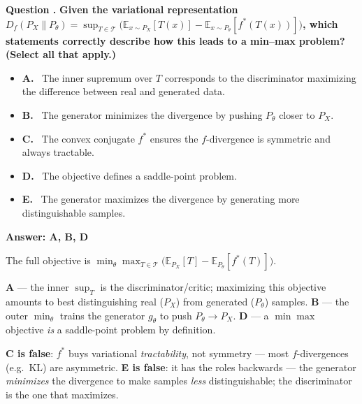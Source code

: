 \documentclass[11pt]{article}
\newcounter{qcounter}
\newcommand{\question}[1]{%
  \refstepcounter{qcounter}%
  \vspace{0.7em}%
  {\large\bfseries\color{accent}Question \theqcounter.}\enspace
  {\bfseries #1}\par\vspace{0.3em}%
}
\newenvironment{answer}{%
  \begin{mdframed}[backgroundcolor=ansbg,linecolor=ansrule,linewidth=0.8pt,
    roundcorner=4pt,innertopmargin=6pt,innerbottommargin=6pt,
    innerleftmargin=8pt,innerrightmargin=8pt,skipabove=6pt,skipbelow=4pt]%
}{\end{mdframed}}
\newenvironment{optionbox}{%
  \begin{mdframed}[backgroundcolor=boxbg,linecolor=boxrule,linewidth=0.6pt,
    roundcorner=3pt,innertopmargin=5pt,innerbottommargin=5pt,
    innerleftmargin=8pt,innerrightmargin=8pt,skipabove=4pt,skipbelow=6pt]%
}{\end{mdframed}}
\newcommand{\optlist}[1]{\begin{itemize}[leftmargin=1.6em,itemsep=2pt,topsep=2pt,label={}]#1\end{itemize}}
\newcommand{\opt}[2]{\item \textbf{#1.}~ #2}
\newcommand{\correct}[1]{\textcolor{ansgreen}{\textbf{Answer: #1}}}
\begin{document}
\question{Given the variational representation
$D_f(P_X\|P_\theta)=\sup_{T\in\mathcal{T}}\big(\mathbb{E}_{x\sim P_X}[T(x)]-\mathbb{E}_{x\sim P_\theta}[f^*(T(x))]\big)$,
which statements correctly describe how this leads to a min--max problem? \textnormal{(Select all that apply.)}}
\begin{optionbox}
\optlist{
\opt{A}{The inner supremum over $T$ corresponds to the discriminator maximizing the difference between real and generated data.}
\opt{B}{The generator minimizes the divergence by pushing $P_\theta$ closer to $P_X$.}
\opt{C}{The convex conjugate $f^*$ ensures the $f$-divergence is symmetric and always tractable.}
\opt{D}{The objective defines a saddle-point problem.}
\opt{E}{The generator maximizes the divergence by generating more distinguishable samples.}
}
\end{optionbox}
\begin{answer}
\correct{A, B, D}\par\vspace{2pt}
The full objective is $\min_\theta\max_{T\in\mathcal{T}}\big(\mathbb{E}_{P_X}[T]-\mathbb{E}_{P_\theta}[f^*(T)]\big)$.\par\vspace{2pt}
\textbf{A} — the inner $\sup_T$ is the discriminator/critic; maximizing this objective amounts to best distinguishing real ($P_X$) from generated ($P_\theta$) samples. \textbf{B} — the outer $\min_\theta$ trains the generator $g_\theta$ to push $P_\theta\to P_X$. \textbf{D} — a $\min\max$ objective \emph{is} a saddle-point problem by definition.\par\vspace{2pt}
\textbf{C is false}: $f^*$ buys variational \emph{tractability}, not symmetry — most $f$-divergences (e.g.\ KL) are asymmetric. \textbf{E is false}: it has the roles backwards — the generator \emph{minimizes} the divergence to make samples \emph{less} distinguishable; the discriminator is the one that maximizes.
\end{answer}
\end{document}
